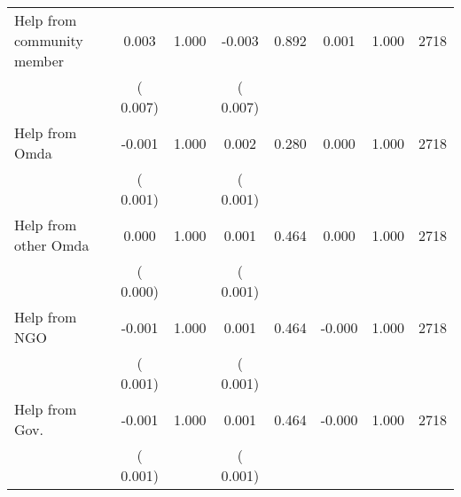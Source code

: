 \begin{tabular}{l*{7}{c}}
 Help from community member       &              0.003       &        1.000  &             -0.003       &        0.892  &              0.001       &              1.000 &  2718 \\ 
                       &       (       0.007)             &                               &       (       0.007)                     &                               &                                               &                                &                      \\ 

 Help from Omda       &             -0.001       &        1.000  &              0.002       &        0.280  &              0.000       &              1.000 &  2718 \\ 
                       &       (       0.001)             &                               &       (       0.001)                     &                               &                                               &                                &                      \\ 

 Help from other Omda       &              0.000       &        1.000  &              0.001       &        0.464  &              0.000       &              1.000 &  2718 \\ 
                       &       (       0.000)             &                               &       (       0.001)                     &                               &                                               &                                &                      \\ 

 Help from NGO       &             -0.001       &        1.000  &              0.001       &        0.464  &             -0.000       &              1.000 &  2718 \\ 
                       &       (       0.001)             &                               &       (       0.001)                     &                               &                                               &                                &                      \\ 

 Help from Gov.       &             -0.001       &        1.000  &              0.001       &        0.464  &             -0.000       &              1.000 &  2718 \\ 
                       &       (       0.001)             &                               &       (       0.001)                     &                               &                                               &                                &                      \\ 

\hline \end{tabular}